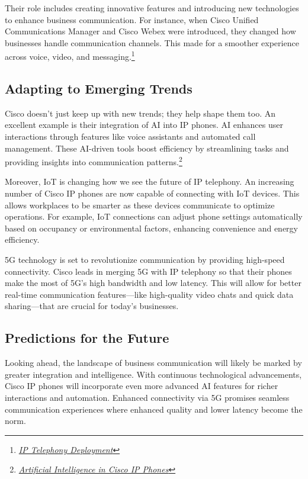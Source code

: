 \documentclass[11pt,a4paper]{article}
\begin{document}
Their role includes creating innovative features and introducing new technologies to enhance business communication. For instance, when Cisco Unified Communications Manager and Cisco Webex were introduced, they changed how businesses handle communication channels. This made for a smoother experience across voice, video, and messaging.\footnote{\href{https://www.cisco.com/c/dam/en_us/about/ciscoitatwork/downloads/ciscoitatwork/pdf/cisco_ip_telephony.pdf}{\textit{IP Telephony Deployment}}}


\subsection*{Adapting to Emerging Trends}

Cisco doesn’t just keep up with new trends; they help shape them too. An excellent example is their integration of AI into IP phones. AI enhances user interactions through features like voice assistants and automated call management. These AI-driven tools boost efficiency by streamlining tasks and providing insights into communication patterns.\footnote{\href{https://www.cisco.com/c/en/us/products/collaboration-endpoints/ip-phones/index.html}{\textit{Artificial Intelligence in Cisco IP Phones}}}


Moreover, IoT is changing how we see the future of IP telephony. An increasing number of Cisco IP phones are now capable of connecting with IoT devices. This allows workplaces to be smarter as these devices communicate to optimize operations. For example, IoT connections can adjust phone settings automatically based on occupancy or environmental factors, enhancing convenience and energy efficiency.

5G technology is set to revolutionize communication by providing high-speed connectivity. Cisco leads in merging 5G with IP telephony so that their phones make the most of 5G's high bandwidth and low latency. This will allow for better real-time communication features—like high-quality video chats and quick data sharing—that are crucial for today’s businesses.

\subsection*{Predictions for the Future}

Looking ahead, the landscape of business communication will likely be marked by greater integration and intelligence. With continuous technological advancements, Cisco IP phones will incorporate even more advanced AI features for richer interactions and automation. Enhanced connectivity via 5G promises seamless communication experiences where enhanced quality and lower latency become the norm.
\end{document}
